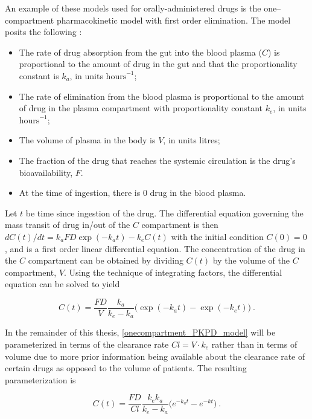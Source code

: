 An example of these models used for orally-administered drugs is the one--compartment pharmacokinetic model with first order elimination.  The model posits the following \cite{wakefield1992bayesian}:  
%
\begin{itemize}
\item The rate of drug absorption from the gut  into the blood plasma ($ C $) is proportional to the amount of drug in the gut and that the proportionality constant is $ k_a $, in units $ \text{hours}^{-1} $;

\item The rate of elimination from the blood plasma is proportional to the amount of drug in the plasma compartment with proportionality constant $ k_e $, in units $ \text{hours}^{-1} $;

\item The volume of plasma in the body is $ V $, in units litres;

\item The fraction of the drug that reaches the systemic circulation is the drug’s bioavailability, $F$.

\item At the time of ingestion, there is 0 drug in the blood plasma.
\end{itemize}

Let $t$ be time since ingestion of the drug.  The differential equation governing the mass transit of drug in/out of the $C$ compartment is then $dC(t)/dt = k_aFD\exp(-k_a t) - k_eC(t)$ with the initial condition $C(0) = 0$, and is a first order linear differential equation.  The concentration of the drug in the $C$ compartment can be obtained by dividing $C(t)$ by the volume of the $C$ compartment, $V$.  Using the technique of integrating factors, the differential equation can be solved to yield

\begin{equation}\label{onecompartment_PKPD_model}
	C(t) = \dfrac{F D}{V}\dfrac{k_a}{k_e - k_a}\Big(\exp(-k_at) - \exp(-k_et)\Big) \>.
\end{equation}

In the remainder of this thesis, \cref{onecompartment_PKPD_model} will be parameterized in terms of the clearance rate $Cl = V \cdot k_e$ rather than in terms of volume due to more prior information being available about the clearance rate of certain drugs as opposed to the volume of patients.  The resulting parameterization is

\begin{equation}\label{onecompartment_PKPD_cl}
	C(t) = \dfrac{F D}{Cl}\dfrac{k_ek_a}{k_e - k_a}\Big(e^{-k_at} - e^{-kt}\Big) \>.
\end{equation}

